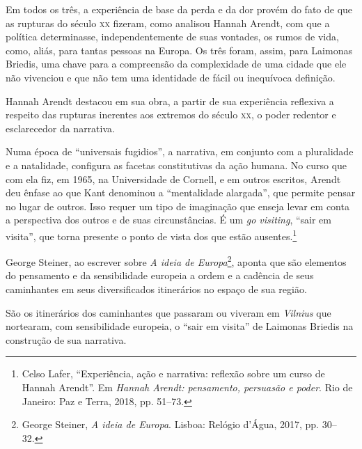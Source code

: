 \begin{multicols}{2}
Em todos os três, a experiência de base da perda e da dor provém do fato
de que as rupturas do século \textsc{xx} fizeram, como analisou Hannah Arendt,
com que a política determinasse, independentemente de suas vontades, os
rumos de vida, como, aliás, para tantas pessoas na Europa. Os três foram, assim, 
para Laimonas Briedis, uma chave para a
compreensão da complexidade de uma cidade que ele não vivenciou e que
não tem uma identidade de fácil ou inequívoca definição.

Hannah Arendt destacou em sua obra, a partir de sua experiência
reflexiva a respeito das rupturas inerentes aos extremos do século \textsc{xx}, o
poder redentor e esclarecedor da narrativa.

Numa época de ``universais fugidios'', a narrativa, em conjunto com a
pluralidade e a natalidade, configura as facetas constitutivas da ação
humana. No curso que com ela fiz, em 1965, na Universidade de Cornell, e
em outros escritos, Arendt deu ênfase ao que Kant denominou a
``mentalidade alargada'', que permite pensar no lugar de outros. Isso
requer um tipo de imaginação que enseja levar em conta a perspectiva dos
outros e de suas circunstâncias. É um \textit{go visiting}, ``sair em
visita'', que torna presente o ponto de vista dos que estão
ausentes.\footnote{Celso Lafer, ``Experiência, ação e narrativa:
  reflexão sobre um curso de Hannah Arendt''. Em \textit{Hannah Arendt:
  pensamento, persuasão e poder}. Rio de Janeiro:
  Paz e Terra, 2018, pp. 51--73.}


George Steiner, ao escrever sobre \textit{A ideia de Europa}\footnote{George Steiner, 
\textit{A ideia de Europa}. Lisboa: Relógio d'Água, 
2017, pp. 30--32.}, aponta que
são elementos do pensamento e da sensibilidade europeia a ordem e a
cadência de seus caminhantes em seus diversificados itinerários no
espaço de sua região.

São os itinerários dos caminhantes que passaram ou viveram em \textit{Vilnius}
que nortearam, com sensibilidade europeia, o ``sair em visita'' de
Laimonas Briedis na construção de sua narrativa.


\end{multicols}
